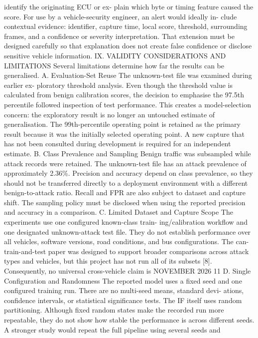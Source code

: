 \documentclass[
]{article}
\begin{document}
identify the originating ECU or ex- plain which byte or timing feature
caused the score. For use by a vehicle-security engineer, an alert would
ideally in- clude contextual evidence: identifier, capture time, local
score, threshold, surrounding frames, and a confidence or severity
interpretation. That extension must be designed carefully so that
explanation does not create false confidence or disclose sensitive
vehicle information. IX. VALIDITY CONSIDERATIONS AND LIMITATIONS Several
limitations determine how far the results can be generalised. A.
Evaluation-Set Reuse The unknown-test file was examined during earlier
ex- ploratory threshold analysis. Even though the threshold value is
calculated from benign calibration scores, the decision to emphasise the
97.5th percentile followed inspection of test performance. This creates
a model-selection concern: the exploratory result is no longer an
untouched estimate of generalisation. The 99th-percentile operating
point is retained as the primary result because it was the initially
selected operating point. A new capture that has not been consulted
during development is required for an independent estimate. B. Class
Prevalence and Sampling Benign traffic was subsampled while attack
records were retained. The unknown-test file has an attack prevalence of
approximately 2.36\%. Precision and accuracy depend on class prevalence,
so they should not be transferred directly to a deployment environment
with a different benign-to-attack ratio. Recall and FPR are also subject
to dataset and capture shift. The sampling policy must be disclosed when
using the reported precision and accuracy in a comparison. C. Limited
Dataset and Capture Scope The experiments use one configured known-class
train- ing/calibration workflow and one designated unknown-attack test
file. They do not establish performance over all vehicles, software
versions, road conditions, and bus configurations. The
can-train-and-test paper was designed to support broader comparisons
across attack types and vehicles, but this project has not run all of
its subsets {[}8{]}. Consequently, no universal cross-vehicle claim is
NOVEMBER 2026 11 D. Single Configuration and Randomness The reported
model uses a fixed seed and one configured training run. There are no
multi-seed means, standard devi- ations, confidence intervals, or
statistical significance tests. The IF itself uses random partitioning.
Although fixed random states make the recorded run more repeatable, they
do not show how stable the performance is across different seeds. A
stronger study would repeat the full pipeline using several seeds and
\end{document}
